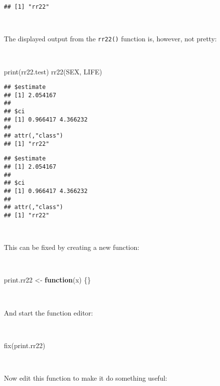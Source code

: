 \documentclass[
  12pt,
  a4paper]{book}
\newenvironment{Shaded}{\begin{snugshade}}{\end{snugshade}}
\newcommand{\AttributeTok}[1]{\textcolor[rgb]{0.77,0.63,0.00}{#1}}
\newcommand{\ControlFlowTok}[1]{\textcolor[rgb]{0.13,0.29,0.53}{\textbf{#1}}}
\newcommand{\DecValTok}[1]{\textcolor[rgb]{0.00,0.00,0.81}{#1}}
\newcommand{\FunctionTok}[1]{\textcolor[rgb]{0.00,0.00,0.00}{#1}}
\newcommand{\NormalTok}[1]{#1}
\newcommand{\OtherTok}[1]{\textcolor[rgb]{0.56,0.35,0.01}{#1}}
\newcommand{\SpecialCharTok}[1]{\textcolor[rgb]{0.00,0.00,0.00}{#1}}
\newcommand{\StringTok}[1]{\textcolor[rgb]{0.31,0.60,0.02}{#1}}
\begin{document}
\begin{verbatim}
## [1] "rr22"
\end{verbatim}

~

The displayed output from the \texttt{rr22()} function is, however, not pretty:

~

\begin{Shaded}
\begin{Highlighting}[]
\FunctionTok{print}\NormalTok{(rr22.test)}
\FunctionTok{rr22}\NormalTok{(SEX, LIFE)}
\end{Highlighting}
\end{Shaded}

\begin{verbatim}
## $estimate
## [1] 2.054167
## 
## $ci
## [1] 0.966417 4.366232
## 
## attr(,"class")
## [1] "rr22"
\end{verbatim}

\begin{verbatim}
## $estimate
## [1] 2.054167
## 
## $ci
## [1] 0.966417 4.366232
## 
## attr(,"class")
## [1] "rr22"
\end{verbatim}

~

This can be fixed by creating a new function:

~

\begin{Shaded}
\begin{Highlighting}[]
\NormalTok{print.rr22 }\OtherTok{\textless{}{-}} \ControlFlowTok{function}\NormalTok{(x) \{\}}
\end{Highlighting}
\end{Shaded}

~

And start the function editor:

~

\begin{Shaded}
\begin{Highlighting}[]
\FunctionTok{fix}\NormalTok{(print.rr22)}
\end{Highlighting}
\end{Shaded}

~

Now edit this function to make it do something useful:

~

\begin{Shaded}
\end{Shaded}
\end{document}
